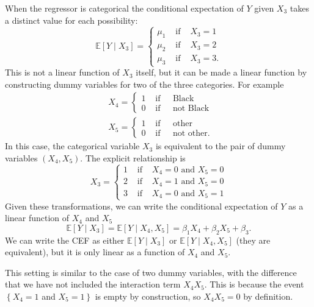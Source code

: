 \documentclass[10pt]{article}
\begin{document}
When the regressor is categorical the conditional expectation of $Y$ given $X_{3}$ takes a distinct value for each possibility:
$$
\mathbb{E}\left[Y \mid X_{3}\right]=\left\{\begin{array}{lll}
\mu_{1} & \text { if } & X_{3}=1 \\
\mu_{2} & \text { if } & X_{3}=2 \\
\mu_{3} & \text { if } & X_{3}=3 .
\end{array}\right.
$$
This is not a linear function of $X_{3}$ itself, but it can be made a linear function by constructing dummy variables for two of the three categories. For example
$$
\begin{aligned}
&X_{4}=\left\{\begin{array}{llc}
1 & \text { if } & \text { Black } \\
0 & \text { if } & \text { not Black }
\end{array}\right. \\
&X_{5}=\left\{\begin{array}{lll}
1 & \text { if } & \text { other } \\
0 & \text { if } & \text { not other. }
\end{array}\right.
\end{aligned}
$$
In this case, the categorical variable $X_{3}$ is equivalent to the pair of dummy variables $\left(X_{4}, X_{5}\right)$. The explicit relationship is
$$
X_{3}=\left\{\begin{array}{lll}
1 & \text { if } & X_{4}=0 \text { and } X_{5}=0 \\
2 & \text { if } & X_{4}=1 \text { and } X_{5}=0 \\
3 & \text { if } & X_{4}=0 \text { and } X_{5}=1
\end{array}\right.
$$
Given these transformations, we can write the conditional expectation of $Y$ as a linear function of $X_{4}$ and $X_{5}$
$$
\mathbb{E}\left[Y \mid X_{3}\right]=\mathbb{E}\left[Y \mid X_{4}, X_{5}\right]=\beta_{1} X_{4}+\beta_{2} X_{5}+\beta_{3} .
$$
We can write the CEF as either $\mathbb{E}\left[Y \mid X_{3}\right]$ or $\mathbb{E}\left[Y \mid X_{4}, X_{5}\right]$ (they are equivalent), but it is only linear as a function of $X_{4}$ and $X_{5}$.

This setting is similar to the case of two dummy variables, with the difference that we have not included the interaction term $X_{4} X_{5}$. This is because the event $\left\{X_{4}=1\right.$ and $\left.X_{5}=1\right\}$ is empty by construction, so $X_{4} X_{5}=0$ by definition.
\end{document}
